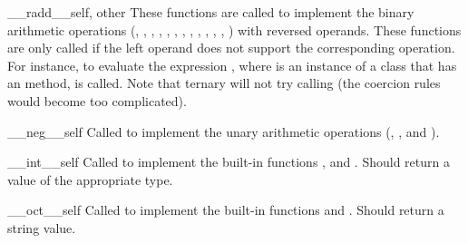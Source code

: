 \begin{methoddescni}{__radd__}{self, other}
These functions are
called to implement the binary arithmetic operations (\code{+},
\code{-}, \code{*}, \code{/}, \code{\%},
,
, \code{**}, \code{<<}, \code{>>},
\code{\&}, \code{\^}, \code{|}) with reversed operands.  These
functions are only called if the left operand does not support the
corresponding operation.  For instance, to evaluate the expression
\code{-}, where  is an instance of a class that
has an  method,  is
called.  Note that ternary  will not
try calling  (the coercion rules would become too
complicated).
\end{methoddescni}

\begin{methoddescni}{__neg__}{self}
Called to implement the unary arithmetic operations (\code{-}, \code{+},
 and \code{~}).
\end{methoddescni}

\begin{methoddescni}{__int__}{self}
Called to implement the built-in functions
,  
and .  Should return a value of
the appropriate type.
\end{methoddescni}

\begin{methoddescni}{__oct__}{self}
Called to implement the built-in functions
 and
.  Should return a string value.
\end{methoddescni}

